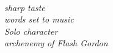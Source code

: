 \leavevmode \\
\begin{center}
    \begin{minipage}{0.6\textwidth}
        \textit{%
            sharp taste \\
            words set to music \\
            Solo character \\
            archenemy of Flash Gordon}%
    \end{minipage}
\end{center}
